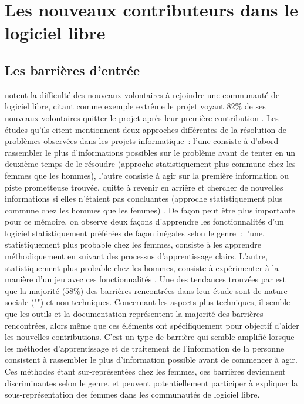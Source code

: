 
\section{Les nouveaux contributeurs dans le logiciel libre}

\subsection{Les barrières d'entrée}

 notent la difficulté des nouveaux volontaires à rejoindre une communauté de
logiciel libre, citant comme exemple extrême le projet  voyant 82\% de ses nouveaux
volontaires quitter le projet après leur première contribution . Les études
qu'ils citent mentionnent deux approches différentes de la résolution de problèmes observées dans les projets
informatique : l'une consiste à d'abord rassembler le plus d'informations possibles sur le problème avant de
tenter en un deuxième temps de le résoudre (approche statistiquement plus commune chez les femmes que les
hommes), l'autre consiste à agir sur la première information ou piste prometteuse trouvée, quitte à revenir en
arrière et chercher de nouvelles informations si elles n'étaient pas concluantes (approche statistiquement
plus commune chez les hommes que les femmes)
. De façon peut être plus
importante pour ce mémoire, on observe deux façons d'apprendre les fonctionnalités d'un logiciel
statistiquement préférées de façon inégales selon le genre : l'une, statistiquement plus probable chez les
femmes, consiste à les apprendre méthodiquement en suivant des processus d'apprentissage clairs. L'autre,
statistiquement plus probable chez les hommes, consiste à expérimenter à la manière d'un jeu avec ces
fonctionnalités . Une des tendances trouvées
par \textcite[p.~1008]{barriers-2018} est que la majorité ($58\%$) des barrières rencontrées dans leur étude
sont de nature sociale ("") et non techniques. Concernant les aspects plus techniques,
il semble que les outils et la documentation représentent la majorité des barrières rencontrées, alors même
que ces éléments ont spécifiquement pour objectif d'aider les nouvelles contributions. C'est un type de
barrière qui semble amplifié lorsque les méthodes d'apprentissage et de traitement de l'information de la
personne consistent à rassembler le plus d'information possible avant de commencer à agir. Ces méthodes étant
sur-représentées chez les femmes, ces barrières deviennent discriminantes selon le genre, et peuvent
potentiellement participer à expliquer la sous-représentation des femmes dans les communautés de logiciel
libre.

